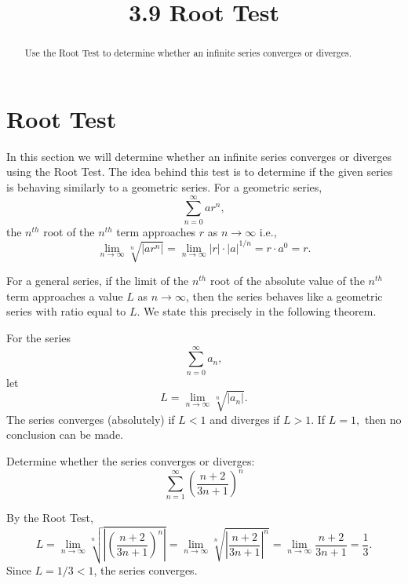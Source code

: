 \documentclass{ximera}
\title{3.9 Root Test}
\begin{document}
\begin{abstract}
Use the Root Test to determine whether an infinite series converges or diverges.
\end{abstract}

\maketitle

\section{Root Test}

In this section we will determine whether an infinite series converges or diverges using the Root Test. 
The idea behind this test is to determine if the given series is behaving similarly to a geometric series.
For a geometric series, 
\[
\sum_{n=0}^\infty ar^n,
\]
the $n^{th}$ root of the $n^{th}$ term approaches $r$ as $n \to \infty$ i.e., 
\[
\lim_{n \to \infty} \sqrt[n]{\left|ar^n\right|} = \lim_{n \to \infty} \left|r\right| \cdot \left|a\right|^{1/n} = r\cdot a^0 = r.
\]



For a general series, if the limit of the $n^{th}$ root of the absolute value of the $n^{th}$ term
approaches a value $L$ as $n \to \infty$, then the series behaves like a geometric series with ratio equal to $L$.
We state this precisely in the following theorem.

\begin{theorem}
For the series
\[
\sum_{n=0}^\infty a_n,
\]
let
\[
L = \lim_{n \to \infty} \sqrt[n]{\left|{a_n}\right|}.
\]
The series converges (absolutely) if $L < 1$ and diverges if $L>1$. 
If $L = 1,$ then no conclusion can be made.

\end{theorem}






\begin{example}[example 1]
Determine whether the series converges or diverges:
\[
\sum_{n=1}^\infty \left(\frac{n+ 2}{3n+1}\right)^n
\]


By the Root Test,
\[
L =  \lim_{n \to \infty} \sqrt[n]{\left|\left(\frac{n+ 2}{3n+1}\right)^n\right|}=  \lim_{n \to \infty} \sqrt[n]{\left|\frac{n+ 2}{3n+1}\right|^n} = \lim_{n \to \infty} \frac{n+ 2}{3n+1} = \frac13.
\]
Since $L = 1/3 < 1$, the series converges.

\end{example}
\end{document}

